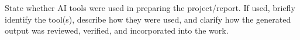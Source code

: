 State whether AI tools were used in preparing the project/report.
If used, briefly identify the tool(s), describe how they were used,
and clarify how the generated output was reviewed, verified, and incorporated into the work.